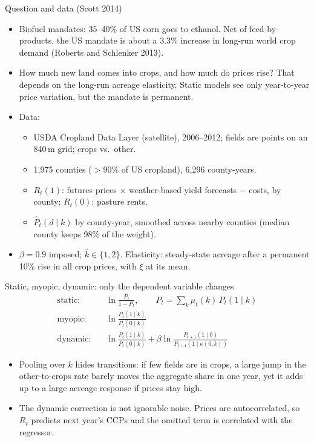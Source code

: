 \documentclass[aspectratio=169,11pt]{beamer}
\begin{document}
\begin{frame}{Question and data (Scott 2014)}
\small
\begin{itemize}
\item Biofuel mandates: 35--40\% of US corn goes to ethanol. Net of feed by-products, the US mandate is about a \alert{3.3\% increase in long-run world crop demand} (Roberts and Schlenker 2013).
\item How much new land comes into crops, and how much do prices rise? That depends on the \alert{long-run} acreage elasticity. Static models see only year-to-year price variation, but the mandate is permanent.
\item Data:
\begin{itemize}
\item USDA Cropland Data Layer (satellite), 2006--2012; fields are points on an 840\,m grid; crops vs.\ other.
\item 1{,}975 counties ($>$90\% of US cropland), 6{,}296 county-years.
\item $R_t(1)$: futures prices $\times$ weather-based yield forecasts $-$ costs, by county; $R_t(0)$: pasture rents.
\item $\hat P_t(d \mid k)$ by county-year, smoothed across nearby counties (median county keeps 98\% of the weight).
\end{itemize}
\item $\beta = 0.9$ imposed; $\bar k \in \{1,2\}$. Elasticity: steady-state acreage after a permanent 10\% rise in all crop prices, with $\xi$ at its mean.
\end{itemize}
\end{frame}

\begin{frame}{Static, myopic, dynamic: only the dependent variable changes}
\small
\begin{align*}
\text{static:}\quad & \ln \frac{P_t}{1-P_t}, \qquad P_t = \textstyle\sum_k \mu_t(k)\, P_t(1 \mid k)\\
\text{myopic:}\quad & \ln \frac{P_t(1 \mid k)}{P_t(0 \mid k)}\\
\text{dynamic:}\quad & \ln \frac{P_t(1 \mid k)}{P_t(0 \mid k)} + \beta \ln \frac{P_{t+1}(1 \mid 0)}{P_{t+1}(1 \mid \kappa(0,k))}
\end{align*}
\begin{itemize}
\item Pooling over $k$ hides transitions: if few fields are in crops, a large jump in the other-to-crops rate barely moves the aggregate share in one year, yet it adds up to a large acreage response if prices stay high.
\item The dynamic correction is not ignorable noise. Prices are autocorrelated, so $R_t$ predicts next year's CCPs and the omitted term is correlated with the regressor.
\end{itemize}
\end{frame}
\end{document}
